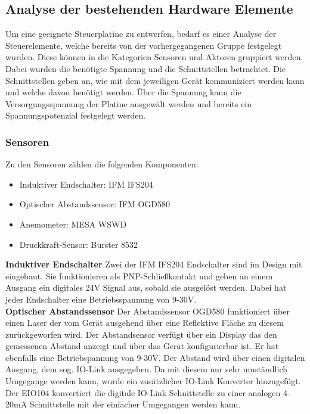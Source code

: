 \label{Analyze_der_Aktoren_und_Sensoren}
\subsection{Analyse der bestehenden Hardware Elemente}
Um eine geeignete Steuerplatine zu entwerfen, bedarf es einer Analyse der Steuerelemente, welche bereits von der vorhergegangenen Gruppe festgelegt wurden. Diese können in die Kategorien Sensoren und Aktoren gruppiert werden. Dabei wurden die benötigte Spannung und die Schnittstellen betrachtet. Die Schnittstellen geben an, wie mit dem jeweiligen Gerät kommuniziert werden kann und welche davon benötigt werden. Über die Spannung kann die Versorgungsspannung der Platine ausgewält werden und bereits ein Spannungspotenzial festgelegt werden.\\

\subsubsection{Sensoren}
Zu den Sensoren zählen die folgenden Komponenten:
\begin{itemize}
	\item Induktiver Endschalter: IFM IFS204
	\item Optischer Abstandssensor: IFM OGD580
	\item Anemometer: MESA WSWD
	\item Druckkraft-Sensor: Burster 8532
\end{itemize}

\noindent\textbf{Induktiver Endschalter}\newline
Zwei der IFM IFS204 Endschalter sind im Design mit eingebaut. Sie funktionieren als PNP-Schließkontakt und geben an einem Ausgang ein digitales 24V Signal aus, sobald sie ausgelöst werden. Dabei hat jeder Endschalter eine Betriebsspannung von 9-30V.\\

\noindent\textbf{Optischer Abstandssensor}\newline
Der Abstandssensor OGD580 funktioniert über einen Laser der vom Gerät ausgehend über eine Reflektive Fläche zu diesem zurückgeworfen wird. Der Abstandsensor verfügt über ein Display das den gemessenen Abstand anzeigt und über das Gerät konfigurierbar ist. Er hat ebenfalls eine Betriebspannung von 9-30V. Der Abstand wird über einen digitalen Ausgang, dem sog. IO-Link ausgegeben. Da mit diesem nur sehr umständlich Umgegange werden kann, wurde ein zusätzlicher IO-Link Konverter hinzugefügt. Der EIO104 konvertiert die digitale IO-Link Schnittstelle zu einer analogen 4-20mA Schnittstelle mit der einfacher Umgegangen werden kann.\\

